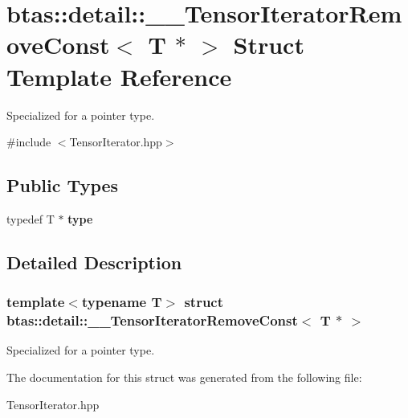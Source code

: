 \hypertarget{structbtas_1_1detail_1_1_____tensor_iterator_remove_const_3_01_t_01_5_01_4}{
\section{btas::detail::\_\-\_\-TensorIteratorRemoveConst$<$ T $\ast$ $>$ Struct Template Reference}
\label{structbtas_1_1detail_1_1_____tensor_iterator_remove_const_3_01_t_01_5_01_4}
}


Specialized for a pointer type.  


{\ttfamily \#include $<$TensorIterator.hpp$>$}\subsection*{Public Types}
\begin{DoxyCompactItemize}
\item 
\hypertarget{structbtas_1_1detail_1_1_____tensor_iterator_remove_const_3_01_t_01_5_01_4_a9e41cdf1a000b2ae200114ef2d5399f3}{
typedef T $\ast$ {\bfseries type}}
\label{structbtas_1_1detail_1_1_____tensor_iterator_remove_const_3_01_t_01_5_01_4_a9e41cdf1a000b2ae200114ef2d5399f3}

\end{DoxyCompactItemize}


\subsection{Detailed Description}
\subsubsection*{template$<$typename T$>$ struct btas::detail::\_\-\_\-TensorIteratorRemoveConst$<$ T $\ast$ $>$}

Specialized for a pointer type. 

The documentation for this struct was generated from the following file:\begin{DoxyCompactItemize}
\item 
TensorIterator.hpp\end{DoxyCompactItemize}
